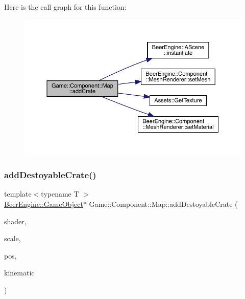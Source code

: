 Here is the call graph for this function\+:
\nopagebreak
\begin{figure}[H]
\begin{center}
\leavevmode
\includegraphics[width=350pt]{class_game_1_1_component_1_1_map_a860f2c45a23d20303aa5e04261ac462d_cgraph}
\end{center}
\end{figure}
\mbox{\label{class_game_1_1_component_1_1_map_ab7d5bd531fc73fa3c4697e6d7fd909f2}} 
\subsubsection{\texorpdfstring{add\+Destoyable\+Crate()}{addDestoyableCrate()}}
{\footnotesize\ttfamily template$<$typename T $>$ \\
\mbox{\hyperlink{class_beer_engine_1_1_game_object}{Beer\+Engine\+::\+Game\+Object}}$\ast$ Game\+::\+Component\+::\+Map\+::add\+Destoyable\+Crate (\begin{DoxyParamCaption}\item[{\mbox{\hyperlink{class_beer_engine_1_1_graphics_1_1_shader_program}{Beer\+Engine\+::\+Graphics\+::\+Shader\+Program}} $\ast$}]{shader,  }\item[{glm\+::vec3}]{scale,  }\item[{glm\+::vec3}]{pos,  }\item[{\mbox{\hyperlink{namespace_beer_engine_1_1_component_a2cfe279cc309b6420e792597940b8a33}{Beer\+Engine\+::\+Component\+::\+R\+B\+Type}}}]{kinematic }\end{DoxyParamCaption})\hspace{0.3cm}{\ttfamily [inline]}}

